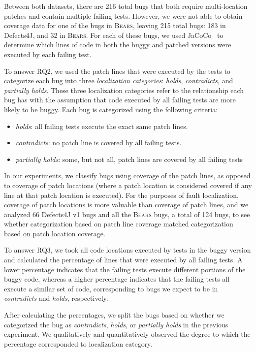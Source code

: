\documentclass[10pt, conference]{IEEEtran}
\newcommand\bears{\textsc{Bears}\xspace}
\begin{document}
Between both datasets, there are 216 total bugs that both require multi-location
patches and contain multiple failing tests. However, we were not able to obtain coverage 
data for one of the bugs in \bears, leaving 215 total bugs: 183 in Defects4J, and 32 in
\bears. 
For each of these bugs, we used JaCoCo~\cite{jacoco}
to determine which lines of code in both the buggy and patched versions were executed
by each failing test.

To answer RQ2, we used the patch lines that were executed by the tests to categorize 
each bug into three \emph{localization categories}: \emph{holds}, \emph{contradicts}, and 
\emph{partially holds}. These three localization categories refer to the relationship each bug has 
with 
the assumption that code executed by all failing tests are more likely to be buggy. Each bug is 
categorized using the following criteria:

\begin{itemize}
\item \emph{holds}:  all failing tests execute the exact same patch lines.
\item \emph{contradicts}: no patch line is covered by all failing tests.
\item \emph{partially holds}: some, but not all, patch lines are covered by all failing tests
\end{itemize}

In our experiments, we classify bugs using coverage of the patch lines, as opposed to 
coverage of 
patch locations (where a patch location is considered covered if any line at that patch location 
is 
executed). For the purposes of fault localization, coverage of patch locations is more valuable 
than coverage of patch lines, and we analyzed 66 Defects4J v1 bugs
 and all the \bears bugs, a total of 124 bugs, to see whether categorization 
based on patch line 
coverage matched categorization based on patch location coverage.

To answer RQ3, we took all code locations executed by tests in the buggy version and
calculated the percentage of lines that were executed by all failing tests. 
A lower percentage indicates that the failing tests execute different portions of the buggy 
code, whereas a higher percentage indicates that the failing tests all execute a similar
set of code, corresponding to bugs we expect to be in \emph{contradicts} and \emph{holds},
respectively.

After calculating the percentages, we split the bugs based on whether we categorized the bug 
as \emph{contradicts}, \emph{holds}, or \emph{partially holds} in the previous experiment.
We qualitatively and quantitatively observed the degree to which the percentage corresponded 
to localization category.
\end{document}
